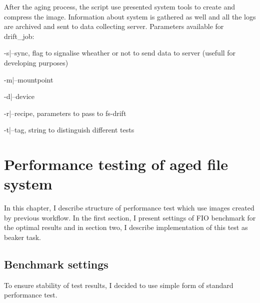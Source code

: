 \documentclass[
  color, %
  table, %
  lof,   %
  lot,   %
]{fithesis3}
\begin{document}
After the aging process, the script use presented system tools to create and compress the image. Information about system is gathered as well and all the logs are archived and sent to data collecting server.
Parameters available for drift\_job:
\begin{compactenum}
  \item -s|--sync, flag to signalise wheather or not to send data to server (usefull for developing purposes)
  \item -m|--mountpoint
  \item -d|--device
  \item -r|--recipe, parameters to pass to fs-drift
  \item -t|--tag, string to distinguish different tests
  \end{compactenum}

\chapter{Performance testing of aged file system}
In this chapter, I describe structure of performance test which use images created by previous workflow. In the first section, I present settings of FIO benchmark for the optimal results and in section two, I describe implementation of this test as beaker task.



\section{Benchmark settings}
To ensure stability of test results, I decided to use simple form of standard performance test.


\end{document}
